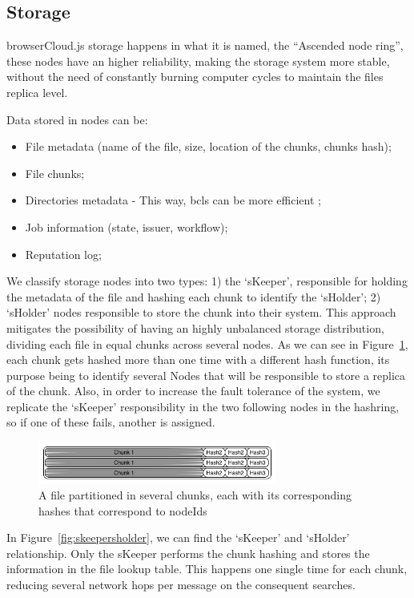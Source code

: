 \subsection{Storage}

browserCloud.js storage happens in what it is named, the ``Ascended node ring'', these nodes have an higher reliability, making the storage system more stable, without the need of constantly burning computer cycles to maintain the files replica level.

Data stored in nodes can be:
\begin{itemize}
  \item File metadata (name of the file, size, location of the chunks, chunks hash);
  \item File chunks;
  \item Directories metadata - This way, bcls can be more efficient ;
  \item Job information (state, issuer, workflow);
  \item Reputation log;
\end{itemize}

We classify storage nodes into two types: 1) the `sKeeper', responsible for holding the metadata of the file and hashing each chunk to identify the `sHolder'; 2) `sHolder' nodes responsible to store the chunk into their system. This approach mitigates the possibility of having an highly unbalanced storage distribution, dividing each file in equal chunks across several nodes. As we can see in Figure~\ref{fig:chunking}, each chunk gets hashed more than one time with a different hash function, its purpose being to identify several Nodes that will be responsible to store a replica of the chunk. Also, in order to increase the fault tolerance of the system, we replicate the `sKeeper' responsibility in the two following nodes in the hashring, so if one of these fails, another is assigned.

\begin{figure}[h!]
  \centering
  \includegraphics[width=0.7\textwidth]{img/chunking.jpg}
  \caption{A file partitioned in several chunks, each with its corresponding hashes that correspond to nodeIds}
  \label{fig:chunking}
\end{figure}

In Figure~\ref{fig:skeepersholder}, we can find the `sKeeper' and `sHolder' relationship. Only the sKeeper performs the chunk hashing and stores the information in the file lookup table. This happens one single time for each chunk, reducing several network hops per message on the consequent searches.

